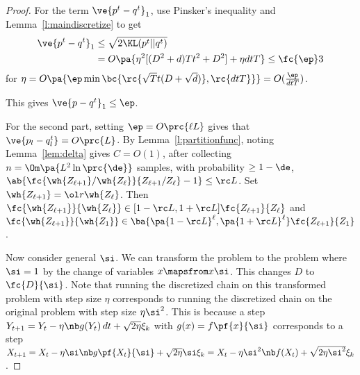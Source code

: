 \begin{proof}
For the term $\ve{p^t-q^t}_1$, use Pinsker's inequality and Lemma~\ref{l:maindiscretize} to get
\begin{align}
\ve{p^t-q^t}_1
&\le 
 \sqrt{2\KL(p^t||q^t)}\\
 &=O\pa{ 
\eta^2[(D^2+d) Tt^2 + D^2] +\eta dtT}\le \fc{\ep}3
\end{align}
for %
$\eta = O\pa{\ep \min\bc{\rc{\sqrt T t(D+\sqrt d)}, \rc{dtT}}} = O(\frac{\ep}{dtT})$. 

This gives $\ve{p-q^t}_1 \le \ep$. 

For the second part, setting $\ep=O\prc{\ell L}$ gives that $\ve{p_l - q^t_l}=O\prc{L}$.
By Lemma~\ref{l:partitionfunc}, noting Lemma~\ref{lem:delta} gives $C=O(1)$, 
 after collecting $n=\Om\pa{L^2\ln \prc{\de}}$ samples, with probability $\ge 1-\de$, $\ab{\fc{\wh{Z_{\ell+1}}/\wh{Z_\ell}}{Z_{\ell+1}/Z_\ell}-1}\le \rc L$. 
Set $\wh{Z_{\ell+1}} = \ol r\wh{Z_\ell}$. Then 
$\fc{\wh{Z_{\ell+1}}}{\wh{Z_\ell}} \in [1-\rc L , 1+\rc L] \fc{Z_{\ell+1}}{Z_\ell}$ and 
$\fc{\wh{Z_{\ell+1}}}{\wh{Z_1}} \in 
\ba{\pa{1-\rc L}^\ell, \pa{1+\rc L}^\ell}\fc{Z_{\ell+1}}{Z_1}$.

Now consider general $\si$. We can transform the problem to the problem where $\si=1$ by the change of variables $x\mapsfrom x\si$. This changes $D$ to $\fc{D}{\si}$. Note that running the discretized chain on this transformed problem with step size $\eta$ corresponds to running the discretized chain on the original problem with step size $\eta \si^2$. This is because a step $Y_{t+1} =Y_t - \eta \nb  g(Y_t) \,dt + \sqrt{2 \eta }\xi_k$ with $g(x) = f\pf{x}{\si}$ corresponds to a step 
 $X_{t+1} = X_t - \eta \si\nb g\pf{X_t}{\si} + \sqrt{2 \eta }\si\xi_k
 = X_t - \eta\si^2 \nb f(X_t) +\sqrt{2\eta \si^2}\xi_k$.
\end{proof}
%
%
